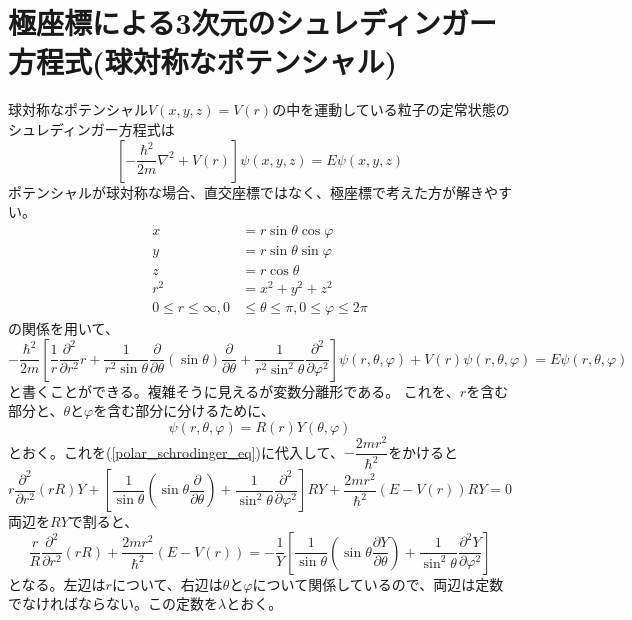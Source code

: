 \section{極座標による3次元のシュレディンガー方程式(球対称なポテンシャル)}
球対称なポテンシャル$V(x,y,z) = V(r)$の中を運動している粒子の定常状態のシュレディンガー方程式は
\begin{equation}
	\left[ -\dfrac{\hbar^2}{2m}\nabla^2 + V(r) \right ]\psi(x,y,z) = E \psi(x,y,z)
\end{equation}
ポテンシャルが球対称な場合、直交座標ではなく、極座標で考えた方が解きやすい。
\begin{align}
	x &= r\sin\theta\cos\varphi \\
	y &= r\sin\theta\sin\varphi \\
	z &= r\cos\theta \\
	r^2 &= x^2 + y^2 + z^2 \\
	0 \leq r \leq \infty, 0 &\leq \theta \leq \pi, 0 \leq \varphi \leq 2\pi
\end{align}
の関係を用いて、
\begin{equation}
	\label{polar_schrodinger_eq}
	-\dfrac{\hbar^2}{2m}\left[
	\dfrac{1}{r}\dfrac{\partial^2}{\partial r^2}r
	+ \dfrac{1}{r^2\sin\theta}\dfrac{\partial}{\partial \theta}(\sin\theta)\dfrac{\partial}{\partial \theta}
	+ \dfrac{1}{r^2\sin^2\theta}\dfrac{\partial^2}{\partial\varphi^2}
	\right]\psi(r,\theta,\varphi)
	+ V(r)\psi(r,\theta,\varphi)
	= E\psi(r,\theta,\varphi)
\end{equation}
と書くことができる。複雑そうに見えるが変数分離形である。
これを、$r$を含む部分と、$\theta$と$\varphi$を含む部分に分けるために、
\begin{equation}
	\label{RY}
	\psi(r,\theta,\varphi) = R(r)Y(\theta,\varphi)
\end{equation}
とおく。これを(\ref{polar_schrodinger_eq})に代入して、$-\dfrac{2mr^2}{\hbar^2}$をかけると
\begin{equation}
	r\dfrac{\partial^2}{\partial r^2}(rR)Y + \left[
	\dfrac{1}{\sin\theta}(\sin\theta\dfrac{\partial}{\partial\theta})
	+ \dfrac{1}{\sin^2\theta}\dfrac{\partial^2}{\partial\varphi^2}
	\right]RY + \dfrac{2mr^2}{\hbar^2}(E-V(r))RY = 0
\end{equation}
両辺を$RY$で割ると、
\begin{equation}
	\dfrac{r}{R}\dfrac{\partial^2}{\partial r^2}(rR) + \dfrac{2mr^2}{\hbar^2}(E-V(r))
	= -\dfrac{1}{Y}\left[
	\dfrac{1}{\sin\theta}(\sin\theta\dfrac{\partial Y}{\partial\theta})
		+ \dfrac{1}{\sin^2\theta}\dfrac{\partial^2 Y}{\partial\varphi^2}
	\right]
\end{equation}
となる。左辺は$r$について、右辺は$\theta$と$\varphi$について関係しているので、両辺は定数でなければならない。この定数を$\lambda$とおく。

